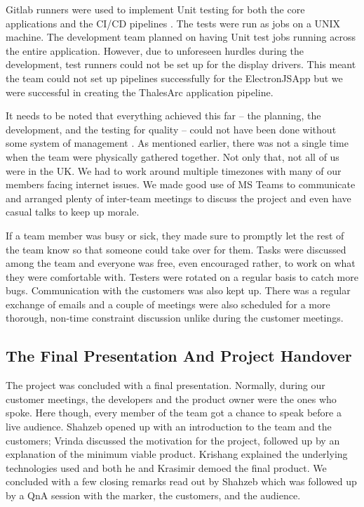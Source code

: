 \documentclass{l3proj}
\begin{document}
Gitlab runners \cite{runner} were used to implement Unit testing for both the core applications and the CI/CD pipelines \cite{pipe}. The tests were run as jobs on a UNIX machine. The development team planned on having Unit test jobs running across the entire application. However, due to unforeseen hurdles during the development, test runners could not be set up for the display drivers. This meant the team could not set up pipelines successfully for the ElectronJSApp but we were successful in creating the ThalesArc application pipeline.

It needs to be noted that everything achieved this far – the planning, the development, and the testing for quality – could not have been done without some system of management \cite{management}. As mentioned earlier, there was not a single time when the team were physically gathered together. Not only that, not all of us were in the UK. We had to work around multiple timezones with many of our members facing internet issues. We made good use of MS Teams to communicate and arranged plenty of inter-team meetings to discuss the project and even have casual talks to keep up morale.

If a team member was busy or sick, they made sure to promptly let the rest of the team know so that someone could take over for them. Tasks were discussed among the team and everyone was free, even encouraged rather, to work on what they were comfortable with. Testers were rotated on a regular basis to catch more bugs. Communication with the customers was also kept up. There was a regular exchange of emails and a couple of meetings were also scheduled for a more thorough, non-time constraint discussion unlike during the customer meetings.

\subsection{The Final Presentation And Project Handover}
 
The project was concluded with a final presentation. Normally, during our customer meetings, the developers and the product owner were the ones who spoke. Here though, every member of the team got a chance to speak before a live audience. Shahzeb opened up with an introduction to the team and the customers; Vrinda discussed the motivation for the project, followed up by an explanation of the minimum viable product. Krishang explained the underlying technologies used and both he and Krasimir demoed the final product. We concluded with a few closing remarks read out by Shahzeb which was followed up by a QnA session with the marker, the customers, and the audience.
\end{document}
